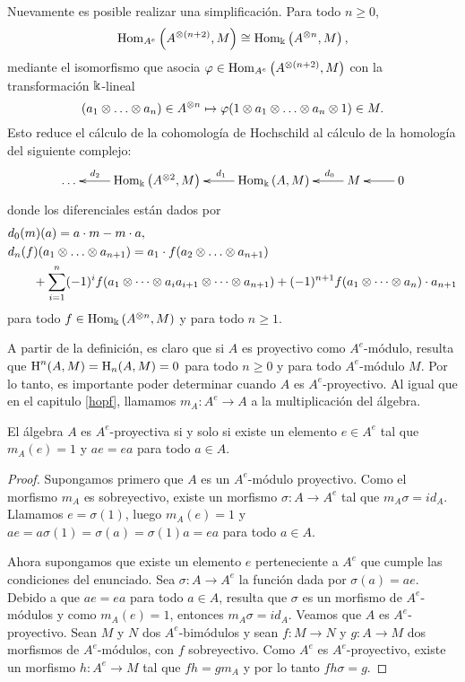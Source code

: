 \documentclass[a4paper,oneside,fleqn,11pt,../tesis.tex]{subfiles}
\begin{document}
Nuevamente es posible realizar una simplificación. Para todo
$n \geq 0$,
\[
	\operatorname{Hom}_{A^e}\left(A^{\otimes (n + 2)}, M\right) \cong \operatorname{Hom}_{\Bbbk}\left(A^{\otimes n}, M\right),
\]
mediante el isomorfismo que asocia $\varphi \in \operatorname{Hom}_{A^e}\left(A^{\otimes (n + 2)}, M \right)$ con la transformación $\Bbbk$-lineal
\[
	(a_1 \otimes \ldots \otimes a_n) \in A^{\otimes n} \mapsto \varphi(1 \otimes a_1 \otimes \ldots \otimes a_n \otimes 1) \in M.
\]
Esto reduce el cálculo de la cohomología de Hochschild al cálculo de la homología del siguiente complejo:
\begin{align*}
	\xymatrix{
		\ldots & \Hom_{\field}\left(A^{\ox 2}, M\right) \ar[l]_(.7){d_2} & \Hom_{\field}\left(A, M\right) \ar[l]_(.45){d_1}
			& M \ar[l]_(.3){d_0} & 0 \ar[l],
	}
\end{align*}
donde los diferenciales están dados por
\begin{align*}
	&d_0(m)(a) = a\cdot m - m\cdot a,\\
	&d_n(f)(a_1 \otimes \ldots \otimes a_{n +1}) = a_1 \cdot f(a_2 \otimes \ldots \otimes a_{n + 1})\\
	&\qquad + \sum_{i = 1}^{n}(-1)^{i} f(a_1 \otimes \cdots \otimes a_i a_{i + 1} \otimes \cdots \otimes a_{n+1})
		 	+ (-1)^{n + 1} f(a_1 \otimes \cdots \otimes a_{n}) \cdot a_{n + 1}
\end{align*}
para todo $f \in \operatorname{Hom}_{\Bbbk}\left(A^{\otimes n}, M\right)$ y para todo $n \geq 1$.

A partir de la definición, es claro que si $A$ es proyectivo como $A^e$-módulo, resulta que $\operatorname{H}^{n}(A, M) = \operatorname{H}_{n}(A,M) = 0$ para todo $n \geq 0$
y para todo $A^e$-módulo $M$. Por lo tanto, es importante poder determinar cuando $A$ es $A^e$-proyectivo. Al igual
que en el capitulo \ref{hopf}, llamamos $m_A :A^e \to A$ a la multiplicación del álgebra.
\begin{prop}
	El álgebra $A$ es $A^e$-proyectiva si y solo si existe un elemento $e \in A^e$ tal que $m_A(e) = 1$ y
	$ae = ea$ para todo $a \in A$.
\end{prop}
\begin{proof}
	Supongamos primero que $A$ es un $A^e$-módulo proyectivo. Como el morfismo $m_A$ es sobreyectivo, existe un morfismo
	$\sigma: A \to A^e$ tal que $m_A \sigma = id_A$. Llamamos $e = \sigma(1)$, luego $m_A(e) = 1$ y
	$ae = a\sigma(1) = \sigma(a) = \sigma(1)a = ea$ para todo $a \in A$.
	
	Ahora supongamos que existe un elemento $e$ perteneciente a $A^e$ que cumple las condiciones del enunciado.
	Sea $\sigma: A \to A^e$ la función dada por $\sigma(a) = ae$. Debido a que $ae = ea$ para todo $a \in A$, resulta que
	$\sigma$ es un morfismo de $A^e$-módulos y como $m_A(e) = 1$, entonces $m_A \sigma = id_A$. Veamos que $A$ es
	$A^e$-proyectivo. Sean $M$ y $N$ dos $A^e$-bimódulos y sean $f:M \to N$ y $g: A \to M$ dos morfismos de $A^e$-módulos,
	con $f$ sobreyectivo. Como $A^e$ es $A^e$-proyectivo, existe un morfismo $h: A^e \to M$ tal que
	$fh = gm_A$ y por lo tanto $fh\sigma = g$.
\end{proof}
\end{document}
